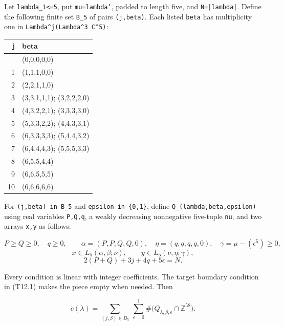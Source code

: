\documentclass[
  10pt,
]{article}
\begin{document}
Let \texttt{\small lambda\_\allowbreak{}1<=\allowbreak{}5}, put
\texttt{\small mu=\allowbreak{}lambda'}, padded to length five, and
\texttt{\small N=\allowbreak{}|lambda|}. Define the following finite set
\texttt{\small B\_\allowbreak{}5} of pairs
\texttt{\small (\allowbreak{}j,\allowbreak{}beta)\allowbreak{}}. Each
listed \texttt{\small beta} has multiplicity one in
\texttt{\small Lambda\textasciicircum{}j(\allowbreak{}Lambda\textasciicircum{}3 C\textasciicircum{}5)\allowbreak{}}:

\begin{longtable}[]{@{}rl@{}}
\toprule\noalign{}
j & beta \\
\midrule\noalign{}
\endhead
\bottomrule\noalign{}
\endlastfoot
0 & (0,0,0,0,0) \\
1 & (1,1,1,0,0) \\
2 & (2,2,1,1,0) \\
3 & (3,3,1,1,1); (3,2,2,2,0) \\
4 & (4,3,2,2,1); (3,3,3,3,0) \\
5 & (5,3,3,2,2); (4,4,3,3,1) \\
6 & (6,3,3,3,3); (5,4,4,3,2) \\
7 & (6,4,4,4,3); (5,5,5,3,3) \\
8 & (6,5,5,4,4) \\
9 & (6,6,5,5,5) \\
10 & (6,6,6,6,6) \\
\end{longtable}

For
\texttt{\small (\allowbreak{}j,\allowbreak{}beta)\allowbreak{} in B\_\allowbreak{}5}
and \texttt{\small epsilon in \{0,\allowbreak{}1\}}, define
\texttt{\small Q\_\allowbreak{}(\allowbreak{}lambda,\allowbreak{}beta,\allowbreak{}epsilon)\allowbreak{}}
using real variables \texttt{\small P,\allowbreak{}Q,\allowbreak{}q}, a
weakly decreasing nonnegative five-tuple \texttt{\small nu}, and two
arrays \texttt{\small x,\allowbreak{}y} as follows:

\[
P\ge Q\ge0,\quad q\ge0,\qquad
\alpha=(P,P,Q,Q,0),\quad \eta=(q,q,q,q,0),\quad
\gamma=\mu-(\epsilon^5)\ge0,
\tag{T12.1}
\] \[
x\in L_5(\alpha,\beta;\nu),\qquad
y\in L_5(\nu,\eta;\gamma),
\tag{T12.2}
\] \[
2(P+Q)+3j+4q+5\epsilon=N.
\tag{T12.3}
\]

Every condition is linear with integer coefficients. The target boundary
condition in (T12.1) makes the piece empty when needed. Then

\[
\boxed{c(\lambda)=
\sum_{(j,\beta)\in B_5}\ \sum_{\epsilon=0}^{1}
\#\bigl(Q_{\lambda,\beta,\epsilon}\cap\mathbb Z^{58}\bigr).}
\tag{T12.4}
\]
\end{document}
